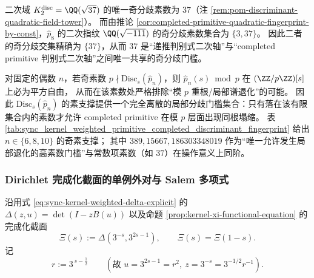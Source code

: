 \begin{corollary}\label{cor:disc2-prim8-shared-ramified-37}
二次域 \(K_2^{\mathrm{disc}}=\QQ(\sqrt{37})\) 的唯一奇分歧素数为 \(37\)（注 \ref{rem:pom-discriminant-quadratic-field-tower}）。
而由推论 \ref{cor:completed-primitive-quadratic-fingerprint-by-const}，\(\widehat p_8\) 的二次指纹 \(\QQ(\sqrt{-111})\) 的奇分歧素数集合为 \(\{3,37\}\)。
因此二者的奇分歧交集精确为 \(\{37\}\)，从而 \(37\) 是“递推判别式二次轴”与“completed primitive 判别式二次轴”之间唯一共享的奇分歧门槛。
\end{corollary}

\begin{remark}\label{rem:hatp-local-double-root-prime-support}
对固定的偶数 \(n\)，若奇素数 \(p\nmid \mathrm{Disc}_s(\widehat p_n)\)，则 \(\widehat p_n(s)\bmod p\) 在 \((\ZZ/p\ZZ)[s]\) 上必为平方自由，
从而在该素数处严格排除“模 \(p\) 重根/局部谱退化”的可能。
因此 \(\mathrm{Disc}_s(\widehat p_n)\) 的素支撑提供一个完全离散的局部分歧门槛集合：只有落在该有限集合内的素数才允许 completed primitive 在模 \(p\) 层面出现同根塌缩。
表 \ref{tab:sync_kernel_weighted_primitive_completed_discriminant_fingerprint} 给出 \(n\in\{6,8,10\}\) 的奇素支撑；
其中 \(389,15667,186303348019\) 作为“唯一允许发生局部退化的高素数门槛”与常数项素数（如 \(37\)）在操作意义上同阶。
\end{remark}



\subsubsection{Dirichlet 完成化截面的单例外对与 Salem 多项式}\label{app:sync-kernel-weighted-dirichlet-xi-single-exception}
沿用式 \eqref{eq:sync-kernel-weighted-delta-explicit} 的 \(\Delta(z,u)=\det(I-zB(u))\) 以及命题 \ref{prop:kernel-xi-functional-equation} 的完成化截面
\[
\Xi(s):=\Delta(3^{-s},3^{2s-1}),
\qquad
\Xi(s)=\Xi(1-s).
\]
记
\[
r:=3^{\,s-\frac12}\qquad(\text{故 }u=3^{2s-1}=r^2,\ z=3^{-s}=3^{-1/2}r^{-1}).
\]

